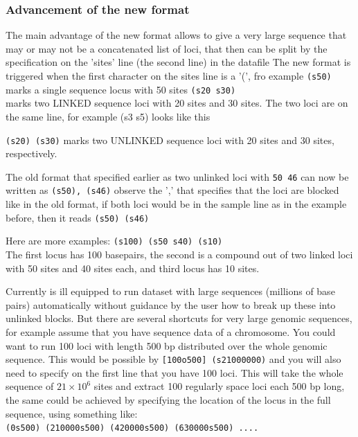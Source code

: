 \subsubsection*{Advancement of the new format}
The main advantage of the new format allows to give a very large sequence that may or may not be a concatenated list of loci,
that then can be split by the specification on the 'sites' line (the second line) in the datafile
The new format is triggered when the first character on the sites line is a '(', fro example
\texttt{(s50)}\\
marks a single sequence locus with 50 sites
\texttt{(s20 s30)}\\
marks two LINKED sequence loci with 20 sites and 30 sites. The two loci are on the same line, for example (s3 s5) looks like this
\begin{flushleft}
\begin{small}
\end{small}
\end{flushleft}

\texttt{(s20) (s30)}
marks two UNLINKED sequence loci with 20 sites and 30 sites, respectively. 


The old format that specified earlier as two unlinked loci with \texttt{50 46} can now be written as 
\texttt{(s50), (s46)} observe the ',' that specifies that the loci are blocked like in the old format, if both loci would be in the sample line as in the example before, then it reads 
\texttt{(s50) (s46)}

Here are more examples:
\texttt{(s100) (s50 s40) (s10)}\\
The first locus has 100 basepairs, the second is a compound out of two linked loci with 50 sites and 40 sites each, and third locus has 10 sites. 

Currently \migrate is ill equipped  to run dataset with large sequences (millions of base pairs) automatically without guidance by the user how to break up these into unlinked blocks. But there are
several shortcuts for very large genomic sequences, for example assume that you have sequence data of a chromosome. You could want to run 100 loci with length 500 bp distributed over the whole genomic sequence. This would be possible by
\texttt{[100o500] (s21000000)} and you will also need to specify on the first line that you have 100 loci.
This will take the whole sequence of $21\times10^6$ sites and extract 100 regularly space loci each 500 bp long, the same could be achieved by specifying the location of the locus in the full sequence, using something like:\\
\texttt{(0s500) (210000s500) (420000s500) (630000s500) ....}

